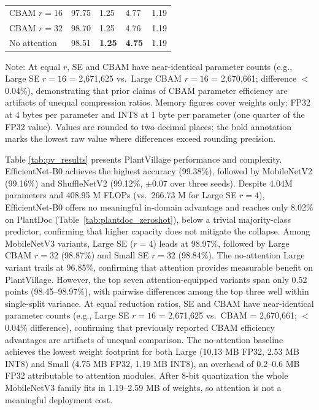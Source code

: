 \documentclass[preprint,12pt]{elsarticle}
\begin{document}
\begin{table}[t]
\begin{tabularx}{\textwidth}{lXXXX}
\quad CBAM $r=16$ & 97.75 & 1.25 & 4.77 & 1.19 \\
\quad CBAM $r=32$ & 98.70 & 1.25 & 4.76 & 1.19 \\
\quad No attention & 98.51 & \textbf{1.25} & \textbf{4.75} & 1.19 \\
\bottomrule
\end{tabularx}
\vspace{4pt}
\small Note: At equal $r$, SE and CBAM have near-identical parameter counts (e.g., Large SE $r=16$ = 2,671,625 vs.\ Large CBAM $r=16$ = 2,670,661; difference $<$0.04\%), demonstrating that prior claims of CBAM parameter efficiency are artifacts of unequal compression ratios. Memory figures cover weights only: FP32 at 4 bytes per parameter and INT8 at 1 byte per parameter (one quarter of the FP32 value). Values are rounded to two decimal places; the bold annotation marks the lowest raw value where differences exceed rounding precision.
\end{table}

Table \ref{tab:pv_results} presents PlantVillage performance and complexity. EfficientNet-B0 achieves the highest accuracy (99.38\%), followed by MobileNetV2 (99.16\%) and ShuffleNetV2 (99.12\%, $\pm$0.07 over three seeds). Despite 4.04M parameters and 408.95 M FLOPs (vs.\ 266.73 M for Large SE $r=4$), EfficientNet-B0 offers no meaningful in-domain advantage and reaches only 8.02\% on PlantDoc (Table~\ref{tab:plantdoc_zeroshot}), below a trivial majority-class predictor, confirming that higher capacity does not mitigate the collapse. Among MobileNetV3 variants, Large SE ($r=4$) leads at 98.97\%, followed by Large CBAM $r=32$ (98.87\%) and Small SE $r=32$ (98.84\%). The no-attention Large variant trails at 96.85\%, confirming that attention provides measurable benefit on PlantVillage. However, the top seven attention-equipped variants span only 0.52 points (98.45--98.97\%), with pairwise differences among the top three well within single-split variance. At equal reduction ratios, SE and CBAM have near-identical parameter counts (e.g., Large SE $r=16$ = 2,671,625 vs.\ CBAM = 2,670,661; $<$0.04\% difference), confirming that previously reported CBAM efficiency advantages are artifacts of unequal comparison. The no-attention baseline achieves the lowest weight footprint for both Large (10.13 MB FP32, 2.53 MB INT8) and Small (4.75 MB FP32, 1.19 MB INT8), an overhead of 0.2--0.6 MB FP32 attributable to attention modules. After 8-bit quantization the whole MobileNetV3 family fits in 1.19--2.59 MB of weights, so attention is not a meaningful deployment cost.
\end{document}
